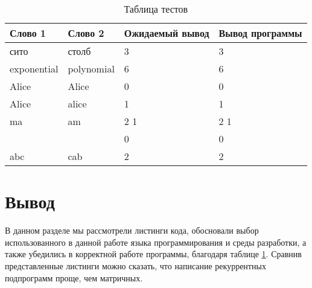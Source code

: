 \begin{table}[ht]
	\centering
	\begin{tabular}{ | l | l | l | l |}
		\hline
		Слово 1 & Слово 2 & Ожидаемый вывод &  Вывод программы  \\ \hline
		сито & столб & 3 & 3 \\ \hline
		exponential & polynomial & 6 & 6 \\ \hline
		Alice & Alice & 0 & 0 \\ \hline
		Alice & alice & 1 & 1 \\ \hline
		ma  & am & 2 1 &  2 1 \\ \hline
		& & 0 & 0 \\ \hline
		abc & cab & 2 & 2 \\ \hline
		\hline
	\end{tabular}
	\caption{Таблица тестов}
	\label{table:ref1}
\end{table} 



\section{Вывод}

В данном разделе мы рассмотрели листинги кода, обосновали выбор использованного в данной работе языка программирования и среды разработки, а также убедились в корректной работе программы, благодаря таблице \ref{table:ref1}.
Сравнив представленные листинги можно сказать, что написание рекуррентных подпрограмм проще, чем матричных.
